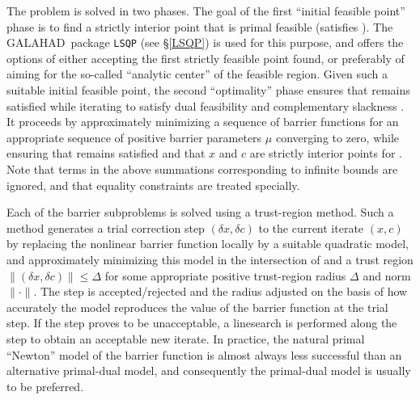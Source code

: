 \documentclass[twoside]{article}
\newcommand{\gal}{{\sf GALAHAD}}
\begin{document}
The problem is solved in two phases. The goal of the first
``initial feasible point'' phase is
to find a strictly interior point that is primal feasible (satisfies
). The \gal\ package {\tt LSQP} (see \S\ref{LSQP})
is used for this purpose, and offers the options of either accepting the first
strictly feasible point found, or preferably of aiming for the
so-called ``analytic center'' of the feasible region.
Given such a suitable initial feasible point, the second ``optimality''
phase ensures that  remains satisfied while iterating to
satisfy dual feasibility  and complementary slackness .
It proceeds by approximately minimizing a
sequence of barrier functions
for an appropriate sequence of positive barrier parameters $\mu$
converging to zero,
while ensuring that  remains satisfied and that
$x$ and $c$ are strictly interior points for .
Note that terms in the above summations corresponding to infinite bounds are
ignored, and that equality constraints are treated specially.

Each of the barrier subproblems is solved using a trust-region method.
Such a method generates a trial correction step $(\delta x, \delta c)$
to the current iterate $(x, c)$
by replacing the nonlinear barrier function locally by a suitable
quadratic model, and approximately minimizing this model in the
intersection of 
and a trust region $\|( \delta x,  \delta c)\| \leq \Delta$
for some appropriate
positive trust-region radius $\Delta$ and norm $\| \cdot \|$.
The step is accepted/rejected
and the radius adjusted on the basis of how accurately the model reproduces the
value of the barrier function at the trial step. If the step proves to be
unacceptable, a linesearch is performed along the step to obtain an acceptable
new iterate. In practice, the natural primal ``Newton'' model of the barrier
function is almost always
less successful than an alternative primal-dual model,
and consequently the primal-dual model is usually to be preferred.
\end{document}
